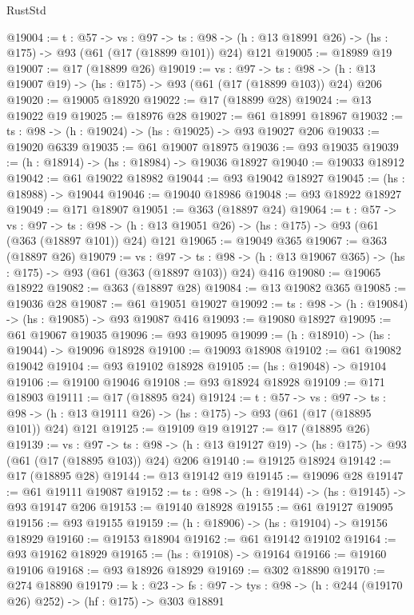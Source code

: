 \begin{lexlean}{RustStd}
\begin{coremodule}
@19004 := {t : @57} ->
  {vs : @97} ->
  {ts : @98} -> (h : @13 @18991 @26) -> (hs : @175) -> @93 (@61 (@17 (@18899 @101)) @24) @121
@19005 := @18989 @19
@19007 := @17 (@18899 @26)
@19019 := {vs : @97} ->
  {ts : @98} -> (h : @13 @19007 @19) -> (hs : @175) -> @93 (@61 (@17 (@18899 @103)) @24) @206
@19020 := @19005 @18920
@19022 := @17 (@18899 @28)
@19024 := @13 @19022 @19
@19025 := @18976 @28
@19027 := @61 @18991 @18967
@19032 := {ts : @98} -> (h : @19024) -> (hs : @19025) -> @93 @19027 @206
@19033 := @19020 @6339
@19035 := @61 @19007 @18975
@19036 := @93 @19035
@19039 := (h : @18914) -> (hs : @18984) -> @19036 @18927
@19040 := @19033 @18912
@19042 := @61 @19022 @18982
@19044 := @93 @19042 @18927
@19045 := (hs : @18988) -> @19044
@19046 := @19040 @18986
@19048 := @93 @18922 @18927
@19049 := @171 @18907
@19051 := @363 (@18897 @24)
@19064 := {t : @57} ->
  {vs : @97} ->
  {ts : @98} -> (h : @13 @19051 @26) -> (hs : @175) -> @93 (@61 (@363 (@18897 @101)) @24) @121
@19065 := @19049 @365
@19067 := @363 (@18897 @26)
@19079 := {vs : @97} ->
  {ts : @98} -> (h : @13 @19067 @365) -> (hs : @175) -> @93 (@61 (@363 (@18897 @103)) @24) @416
@19080 := @19065 @18922
@19082 := @363 (@18897 @28)
@19084 := @13 @19082 @365
@19085 := @19036 @28
@19087 := @61 @19051 @19027
@19092 := {ts : @98} -> (h : @19084) -> (hs : @19085) -> @93 @19087 @416
@19093 := @19080 @18927
@19095 := @61 @19067 @19035
@19096 := @93 @19095
@19099 := (h : @18910) -> (hs : @19044) -> @19096 @18928
@19100 := @19093 @18908
@19102 := @61 @19082 @19042
@19104 := @93 @19102 @18928
@19105 := (hs : @19048) -> @19104
@19106 := @19100 @19046
@19108 := @93 @18924 @18928
@19109 := @171 @18903
@19111 := @17 (@18895 @24)
@19124 := {t : @57} ->
  {vs : @97} ->
  {ts : @98} -> (h : @13 @19111 @26) -> (hs : @175) -> @93 (@61 (@17 (@18895 @101)) @24) @121
@19125 := @19109 @19
@19127 := @17 (@18895 @26)
@19139 := {vs : @97} ->
  {ts : @98} -> (h : @13 @19127 @19) -> (hs : @175) -> @93 (@61 (@17 (@18895 @103)) @24) @206
@19140 := @19125 @18924
@19142 := @17 (@18895 @28)
@19144 := @13 @19142 @19
@19145 := @19096 @28
@19147 := @61 @19111 @19087
@19152 := {ts : @98} -> (h : @19144) -> (hs : @19145) -> @93 @19147 @206
@19153 := @19140 @18928
@19155 := @61 @19127 @19095
@19156 := @93 @19155
@19159 := (h : @18906) -> (hs : @19104) -> @19156 @18929
@19160 := @19153 @18904
@19162 := @61 @19142 @19102
@19164 := @93 @19162 @18929
@19165 := (hs : @19108) -> @19164
@19166 := @19160 @19106
@19168 := @93 @18926 @18929
@19169 := @302 @18890
@19170 := @274 @18890
@19179 := {k : @23} ->
  {fs : @97} -> {tys : @98} -> (h : @244 (@19170 @26) @252) -> (hf : @175) -> @303 @18891

\end{coremodule}
\end{lexlean}
